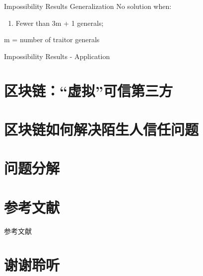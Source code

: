 \documentclass[11pt]{beamer}
\begin{document}
\begin{frame}{Impossibility Results Generalization}
	No solution when:
	\begin{enumerate}
		\item Fewer than 3m + 1 generals;
	\end{enumerate}
m = number of traitor generals
\end{frame}

\begin{frame}{Impossibility Results - Application}
	
\end{frame}






\section{区块链：“虚拟”可信第三方}

\section{区块链如何解决陌生人信任问题}

\section{问题分解}

\section{参考文献}
\begin{frame}{参考文献}
	\printbibliography
\end{frame}

\section*{谢谢聆听}
\end{document}
